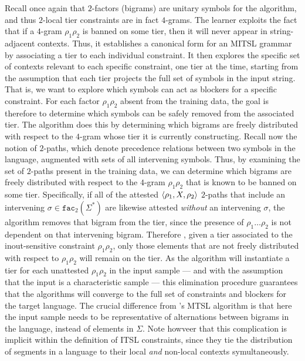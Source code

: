 \documentclass[11pt,a4paper]{article}
\newcommand{\facn}[1]{\ensuremath{\texttt{fac}_{#1}}}
\begin{document}
Recall once again that $2$-factors (bigrams) are unitary symbols for the algorithm, and thus $2$-local tier constraints are in fact $4$-grams.
The learner exploits the fact that if a $4$-gram $\rho_1\rho_2$ is banned on some tier, then it will never appear in string-adjacent contexts.
Thus, it establishes a canonical form for an MITSL grammar by associating a tier to each individual constraint.
It then explores the specific set of contexts relevant to each specific constraint, one tier at the time, starting from the assumption that each tier projects the full set of symbols in the input string.
That is, we want to explore which symbols can act as blockers for a specific constraint.
 For each factor $\rho_1\rho_2$ absent from the training data, the goal is therefore to determine which symbols can be safely removed from the associated tier. 
 The algorithm does this by determining which bigrams are freely distributed with respect to the $4$-gram whose tier it is currently constructing.
Recall now the notion of $2$-paths, which denote precedence relations between two symbols in the language, augmented with sets of all intervening symbols.
Thus, by examining the set of $2$-paths present in the training data, we can determine which bigrams are freely distributed with respect to the $4$-gram $\rho_1\rho_2$ that is known to be banned on some tier. 
  Specifically, if all of the attested $\langle{\rho_1, X, \rho_2}\rangle$ $2$-paths that include an intervening $\sigma \in \facn{2}(\Sigma^*)$ are likewise attested \emph{without} an intervening $\sigma$, the algorithm removes that bigram from the tier, since the presence of $\rho_1\ldots{}\rho_2$ is not dependent on that intervening bigram.
Therefore , given a tier associated to the inout-sensitive constraint  $\rho_1\rho_2$, only those elements that are not freely distributed with respect to  $\rho_1\rho_2$ will remain on the tier.
As the algorithm will instantiate a tier for each unattested   $\rho_1\rho_2$ in the input sample --- and  with the assumption that the input is a characteristic sample  --- this elimination procedure guarantees that the algorithms will converge to the full set of constraints and blockers for the target language.
  The crucial difference from \citet{McMullinSCIL2019}'s MTSL algorithm is that here the input sample needs to be representative of alternations between bigrams in the language, instead of elements in $\Sigma$.
  Note howveer that this complication is implicit within the definition of ITSL constraints, since they tie the distribution of segments in a language to their local \emph{and} non-local contexts symultaneously.
\end{document}
